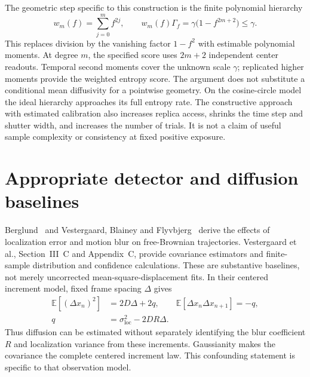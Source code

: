 The geometric step specific to this construction is the finite polynomial
hierarchy
\begin{equation}
 w_m(f)=\sum_{j=0}^{m}f^{2j},\qquad
 w_m(f)\Gamma_f=\gamma\bigl(1-f^{2m+2}\bigr)\leq\gamma.
 \label{eq:dc-literature-hierarchy}
\end{equation}
This replaces division by the vanishing factor $1-f^2$ with estimable
polynomial moments. At degree $m$, the specified score uses $2m+2$ independent
center readouts. Temporal second moments cover the unknown scale $\gamma$;
replicated higher moments provide the weighted entropy score. The argument
does not substitute a conditional mean diffusivity for a pointwise geometry.
On the cosine-circle model the ideal hierarchy approaches its full entropy
rate. The constructive approach with estimated calibration also increases
replica access, shrinks the time step and shutter width, and increases the
number of trials. It is not a claim of useful sample complexity or consistency
at fixed positive exposure.

\section{Appropriate detector and diffusion baselines}

Berglund~\cite{dgBerglund2010} and Vestergaard, Blainey and
Flyvbjerg~\cite{dgVestergaard2014} derive the effects of localization error
and motion blur on free-Brownian trajectories. Vestergaard et al.,
Section~III~C and Appendix~C, provide covariance estimators and finite-sample
distribution and confidence calculations. These are substantive baselines,
not merely uncorrected mean-square-displacement fits. In their centered
increment model, fixed frame spacing $\Delta$ gives
\begin{equation}
 \begin{split}
 \mathbb E[(\Delta x_n)^2]&=2D\Delta+2q,\qquad
 \mathbb E[\Delta x_n\Delta x_{n+1}]=-q,\\
 q&=\sigma_{\mathrm{loc}}^2-2DR\Delta.
 \end{split}
 \label{eq:dc-literature-brownian}
\end{equation}
Thus diffusion can be estimated without separately identifying the blur
coefficient $R$ and localization variance from these increments. Gaussianity
makes the covariance the complete centered increment law. This confounding
statement is specific to that observation model.

